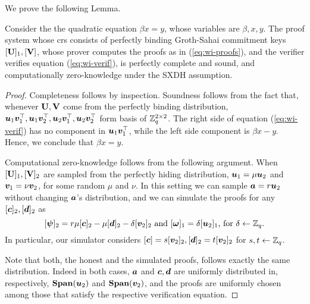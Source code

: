We prove the following Lemma.
\begin{lemma} \label{lemma:betax=y}
Consider the the quadratic equation $\beta x = y$, whose variables are $\beta,x,y$. 
The proof system whose crs consists of perfectly binding Groth-Sahai commitment keys $[\mathbf{{U}}]_1,[\mathbf{{V}}]$, whose prover computes the proofs as in (\ref{eq:wi-proofs}), and the verifier verifies equation (\ref{eq:wi-verif}), is perfectly complete and sound, and computationally zero-knowledge under the SXDH assumption.
\end{lemma}
\begin{proof}
Completeness follows by inspection. 
Soundness follows from the fact that, whenever $\mathbf{{U}},\mathbf{{V}}$ come from the perfectly binding distribution, ${\boldsymbol{u}}_1{\boldsymbol{v}}_1^\top,{\boldsymbol{u}}_1{\boldsymbol{v}}_2^\top,\allowbreak{\boldsymbol{u}}_2{\boldsymbol{v}}_1^\top,\allowbreak{\boldsymbol{u}}_2{\boldsymbol{v}}_2^\top$ form basis of $\mathbb{Z}_q^{2\times 2}$.
The right side of equation (\ref{eq:wi-verif}) has no component in ${\boldsymbol{u}}_1{\boldsymbol{v}}^\top_1$, while the left side component is $\beta x-y$. Hence, we conclude that $\beta x = y$.

Computational zero-knowledge follows from the following argument.
When $[\mathbf{{U}}]_1,[\mathbf{{V}}]_2$ are sampled from the perfectly hiding distribution, ${\boldsymbol{u}}_1 = \mu{\boldsymbol{u}}_2$ and ${\boldsymbol{v}}_1  = \nu{\boldsymbol{v}}_2$, for some random $\mu$ and $\nu$. In this setting we can sample ${\boldsymbol{a}} = r{\boldsymbol{u}}_2$ without changing ${\boldsymbol{a}}$'s distribution, and we can simulate the proofs for any $[{\boldsymbol{c}}]_2,[{\boldsymbol{d}}]_2$ as 
\begin{equation} \label{eq:sim-proofs}
[{\boldsymbol{\psi}}]_2 = r\mu[{\boldsymbol{c}}]_2-\mu[{\boldsymbol{d}}]_2-\delta[{\boldsymbol{v}}_2]_2\text{ and }[{\boldsymbol{\omega}}]_1 = \delta[{\boldsymbol{u}}_2]_1\text{, for } \delta\gets\mathbb{Z}_q.
\end{equation} 
In particular, our simulator considers $[{\boldsymbol{c}}]=s[{\boldsymbol{v}}_2]_2,[{\boldsymbol{d}}]_2=t[{\boldsymbol{v}}_2]_2$ for $s,t\gets\mathbb{Z}_q$.

Note that both, the honest and the simulated proofs, follows exactly the same distribution. Indeed in both cases, ${\boldsymbol{a}}$ and ${\boldsymbol{c}},{\boldsymbol{d}}$ are uniformly distributed in, respectively, $\mathbf{Span}({\boldsymbol{u}}_2)$ and $\mathbf{Span}({\boldsymbol{v}}_2)$, and the proofs are uniformly chosen among those that satisfy the respective verification equation.

\end{proof} 


